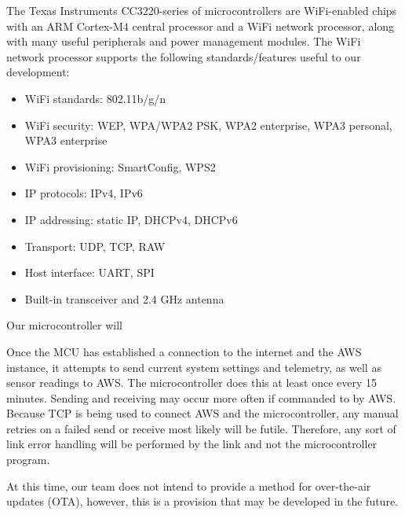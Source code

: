 \begin{flushleft}
    The Texas Instruments CC3220-series of microcontrollers are WiFi-enabled
    chips with an ARM Cortex-M4 central processor and a WiFi network processor,
    along with many useful peripherals and power management modules. The WiFi
    network processor supports the following standards/features useful to our
    development:
    \begin{itemize}
        \item WiFi standards: 802.11b/g/n
        \item WiFi security: WEP, WPA/WPA2 PSK, WPA2 enterprise, WPA3 personal,
        WPA3 enterprise
        \item WiFi provisioning: SmartConfig, WPS2
        \item IP protocols: IPv4, IPv6
        \item IP addressing: static IP, DHCPv4, DHCPv6
        \item Transport: UDP, TCP, RAW
        \item Host interface: UART, SPI
        \item Built-in transceiver and 2.4 GHz antenna
    \end{itemize}
    Our microcontroller will 
\end{flushleft}
\begin{flushleft}
\end{flushleft}
\begin{flushleft}
    Once the MCU has established a connection to the internet and the AWS
    instance, it attempts to send current system settings and telemetry, as
    well as sensor readings to AWS. The microcontroller does this at least
    once every 15 minutes. Sending and receiving may occur more often if
    commanded to by AWS. Because TCP is being used to connect AWS and the
    microcontroller, any manual retries on a failed send or receive most
    likely will be futile. Therefore, any sort of link error handling will
    be performed by the link and not the microcontroller program.
\end{flushleft}
\begin{flushleft}
    At this time, our team does not intend to provide a method for over-the-air
    updates (OTA), however, this is a provision that may be developed in the
    future.
\end{flushleft}
